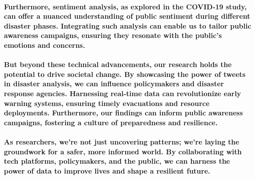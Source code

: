 \documentclass{article}
\begin{document}
\paragraph{Furthermore, sentiment analysis, as explored in the COVID-19 study, can offer a nuanced understanding of public sentiment during different disaster phases. Integrating such analysis can enable us to tailor public awareness campaigns, ensuring they resonate with the public's emotions and concerns.}
\paragraph{But beyond these technical advancements, our research holds the potential to drive societal change. By showcasing the power of tweets in disaster analysis, we can influence policymakers and disaster response agencies. Harnessing real-time data can revolutionize early warning systems, ensuring timely evacuations and resource deployments. Furthermore, our findings can inform public awareness campaigns, fostering a culture of preparedness and resilience.}
\paragraph{As researchers, we're not just uncovering patterns; we're laying the groundwork for a safer, more informed world. By collaborating with tech platforms, policymakers, and the public, we can harness the power of data to improve lives and shape a resilient future.}
\printbibliography
\end{document}
